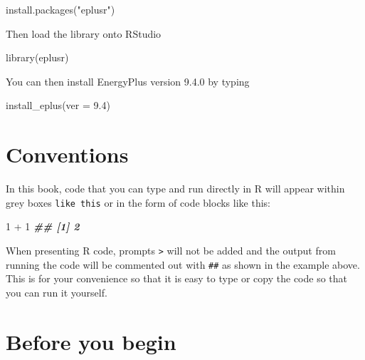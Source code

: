 \documentclass[
]{book}
\newenvironment{Shaded}{\begin{snugshade}}{\end{snugshade}}
\newcommand{\AttributeTok}[1]{\textcolor[rgb]{0.77,0.63,0.00}{#1}}
\newcommand{\DecValTok}[1]{\textcolor[rgb]{0.00,0.00,0.81}{#1}}
\newcommand{\DocumentationTok}[1]{\textcolor[rgb]{0.56,0.35,0.01}{\textbf{\textit{#1}}}}
\newcommand{\FloatTok}[1]{\textcolor[rgb]{0.00,0.00,0.81}{#1}}
\newcommand{\FunctionTok}[1]{\textcolor[rgb]{0.00,0.00,0.00}{#1}}
\newcommand{\NormalTok}[1]{#1}
\newcommand{\SpecialCharTok}[1]{\textcolor[rgb]{0.00,0.00,0.00}{#1}}
\newcommand{\StringTok}[1]{\textcolor[rgb]{0.31,0.60,0.02}{#1}}
\begin{document}
\begin{Shaded}
\begin{Highlighting}[]
\FunctionTok{install.packages}\NormalTok{(}\StringTok{"eplusr"}\NormalTok{)}
\end{Highlighting}
\end{Shaded}

Then load the library onto RStudio

\begin{Shaded}
\begin{Highlighting}[]
\FunctionTok{library}\NormalTok{(eplusr)}
\end{Highlighting}
\end{Shaded}

You can then install EnergyPlus version 9.4.0 by typing

\begin{Shaded}
\begin{Highlighting}[]
\FunctionTok{install\_eplus}\NormalTok{(}\AttributeTok{ver =} \FloatTok{9.4}\NormalTok{)}
\end{Highlighting}
\end{Shaded}

\hypertarget{conventions}{%
\section*{Conventions}\label{conventions}}

In this book, code that you can type and run directly in R will appear within grey boxes \texttt{like\ this} or in the form of code blocks like this:

\begin{Shaded}
\begin{Highlighting}[]
\DecValTok{1} \SpecialCharTok{+} \DecValTok{1}
\DocumentationTok{\#\# [1] 2}
\end{Highlighting}
\end{Shaded}

When presenting R code, prompts \texttt{\textgreater{}} will not be added and the output from running the code will be commented out with \texttt{\#\#} as shown in the example above. This is for your convenience so that it is easy to type or copy the code so that you can run it yourself.

\hypertarget{before-you-begin}{%
\section*{Before you begin}\label{before-you-begin}}
\end{document}
